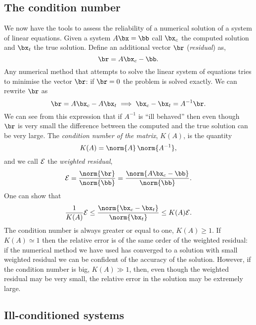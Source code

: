 \subsection{The condition number}

We  now  have the   tools  to assess  the reliability  of  a numerical
solution of  a system of linear equations.    Given a system  $A \bx =
\bb$ call $\bx_c$ the computed solution and $\bx_t$ the true solution.
Define an additional vector $\br$ (\textit{residual}) as,
%
\begin{equation*}
 \br = A \bx_c - \bb .
\end{equation*}
%
Any numerical    method that attempts  to solve   the linear system of
equations tries to  minimise the  vector $\br$: if  $\br =  0$ the
problem is solved exactly.  We can rewrite $\br$ as
%
\begin{equation*}
  \br = A \bx_c - A \bx_t \implies \bx_c - \bx_t = A^{-1} \br .
\end{equation*}
%
We can  see from this expression  that if $A^{-1}$  is ``ill behaved''
then  even   though $\br$  is very  small   the difference between the
computed and the true solution  can be very  large.  The
\textit{condition number of the matrix}, $K(A)$, is the
quantity
%
\begin{equation*}
  K(A) = \norm{ A } \, \norm{ A^{-1} },
\end{equation*}
%
and we call ${\cal E}$ the \textit{weighted residual},
%
\begin{equation*}
  {\cal E} = \frac{\norm{ \br }}{\norm{ \bb }} =
  \frac{\norm{ A \bx_c - \bb }}{\norm{ \bb }} .
\end{equation*}
%
One can show that
%
\begin{equation}
 \frac{1}{K(A)} {\cal E} \le
      \frac{ \norm{ \bx_c - \bx_t }}{\norm{ \bx_t }} \le
      K(A) {\cal E} .
 \label{cond_and_res}
\end{equation}
%
The condition number is always greater or equal to one, $K(A) \ge 1$.
If $K(A) \simeq 1$ then the relative error is of the same order of the
weighted residual: if the numerical method we have used has converged
to a solution with small weighted residual we can be confident of the
accuracy of the solution.  However, if the condition number is big,
$K(A) \gg 1$, then, even though the weighted residual may be very
small, the relative error in the solution may be extremely large.

\subsection{Ill-conditioned systems}

